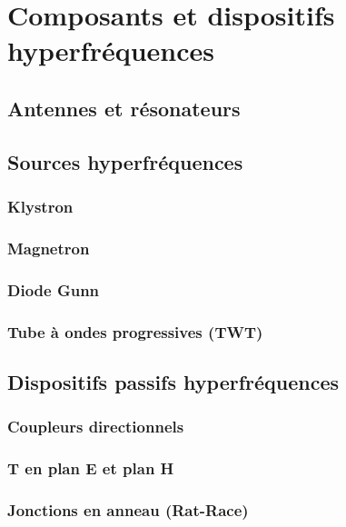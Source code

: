 \chapter{Composants et dispositifs hyperfréquences} \label{chap:microwave_components}
\section{Antennes et résonateurs} \label{subsec:antennas_resonators}
\section{Sources hyperfréquences} \label{subsec:microwave_sources}
\subsection{Klystron} \label{subsec:klystron}
\subsection{Magnetron} \label{subsec:magnetron}
\subsection{Diode Gunn} \label{subsec:gunn_diode}
\subsection{Tube à ondes progressives (TWT)} \label{subsec:twt}
\section{Dispositifs passifs hyperfréquences} \label{subsec:passive_microwave}
\subsection{Coupleurs directionnels} \label{subsec:directional_couplers}
\subsection{T en plan E et plan H} \label{subsec:eplane_hplane}
\subsection{Jonctions en anneau (Rat-Race)} \label{subsec:rat_race}
